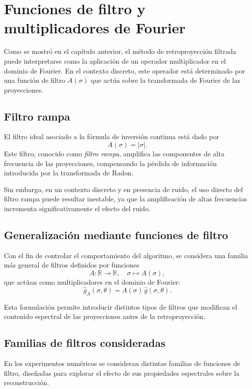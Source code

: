 \section{Funciones de filtro y multiplicadores de Fourier}

Como se mostró en el capítulo anterior, el método de retroproyección filtrada puede interpretarse como la aplicación de un operador multiplicador en el dominio de Fourier. En el contexto discreto, este operador está determinado por una función de filtro $A(\sigma)$ que actúa sobre la transformada de Fourier de las proyecciones.

\subsection*{Filtro rampa}

El filtro ideal asociado a la fórmula de inversión continua está dado por
\[
A(\sigma) = |\sigma|.
\]
Este filtro, conocido como \emph{filtro rampa}, amplifica las componentes de alta frecuencia de las proyecciones, compensando la pérdida de información introducida por la transformada de Radon.

Sin embargo, en un contexto discreto y en presencia de ruido, el uso directo del filtro rampa puede resultar inestable, ya que la amplificación de altas frecuencias incrementa significativamente el efecto del ruido.

\subsection*{Generalización mediante funciones de filtro}

Con el fin de controlar el comportamiento del algoritmo, se considera una familia más general de filtros definidos por funciones
\[
A : \mathbb{R} \to \mathbb{R}, \quad \sigma \mapsto A(\sigma),
\]
que actúan como multiplicadores en el dominio de Fourier:
\[
\widehat{g}_{A}(\sigma,\theta) = A(\sigma)\,\widehat{g}(\sigma,\theta).
\]

Esta formulación permite introducir distintos tipos de filtros que modifican el contenido espectral de las proyecciones antes de la retroproyección.

\subsection*{Familias de filtros consideradas}

En los experimentos numéricos se consideran distintas familias de funciones de filtro, diseñadas para explorar el efecto de sus propiedades espectrales sobre la reconstrucción.

